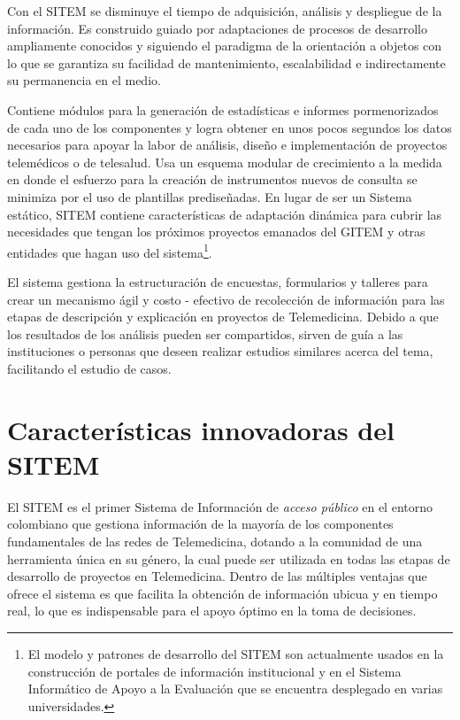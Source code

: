 







Con el SITEM se disminuye el tiempo de adquisición, análisis y despliegue de la información. Es construido guiado por adaptaciones de procesos de desarrollo ampliamente conocidos \cite{koch}\cite{jacobson2000}\cite{larman2004} y siguiendo el paradigma de la orientación a objetos con lo que se garantiza su facilidad de mantenimiento, escalabilidad e indirectamente su permanencia en el medio.

Contiene módulos para la generación de estadísticas e informes pormenorizados de cada uno de los componentes y logra obtener en unos pocos segundos los datos necesarios para apoyar la labor de análisis, diseño e implementación de proyectos telemédicos o de telesalud. Usa un esquema modular de crecimiento a la medida en donde el esfuerzo para la creación de instrumentos nuevos de consulta se minimiza por el uso de plantillas prediseñadas. En lugar de ser un Sistema estático, SITEM contiene características de adaptación dinámica para cubrir las necesidades que tengan los próximos proyectos emanados del GITEM y otras entidades que hagan uso del sistema\footnote{El modelo y patrones de desarrollo del SITEM son actualmente usados en la construcción de portales de información institucional y en el Sistema Informático de Apoyo a la Evaluación que se encuentra desplegado en varias universidades.}.

El sistema gestiona la estructuración de encuestas, formularios y talleres para crear un mecanismo ágil y costo - efectivo de recolección de información para las etapas de descripción y explicación\cite{hurtado2000} en proyectos de Telemedicina. Debido a que los resultados de los análisis pueden ser compartidos, sirven de guía a las instituciones o personas que deseen realizar estudios similares acerca del tema, facilitando el estudio de casos.

\section{Características innovadoras del SITEM}

El SITEM es el primer Sistema de Información de \textit{acceso público} en el entorno colombiano que gestiona información de la mayoría de los componentes fundamentales de las redes de Telemedicina, dotando a la comunidad de una herramienta única en su género, la cual puede ser utilizada en todas las etapas de desarrollo de proyectos en Telemedicina. Dentro de las múltiples ventajas que ofrece el sistema es que facilita la obtención de información ubicua y en tiempo real, lo que es indispensable para el apoyo óptimo en la toma de decisiones. 


